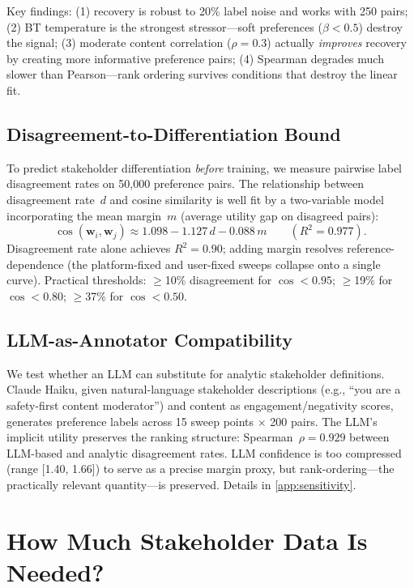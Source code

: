 \documentclass[11pt,letterpaper]{article}
\begin{document}
Key findings: (1) recovery is robust to 20\% label noise and works
with 250 pairs; (2) BT temperature is the strongest stressor---soft
preferences ($\beta < 0.5$) destroy the signal; (3) moderate content
correlation ($\rho = 0.3$) actually \emph{improves} recovery by
creating more informative preference pairs; (4) Spearman degrades
much slower than Pearson---rank ordering survives conditions that
destroy the linear fit.

\subsection{Disagreement-to-Differentiation Bound}

To predict stakeholder differentiation \emph{before} training, we
measure pairwise label disagreement rates on 50{,}000 preference
pairs. The relationship between disagreement rate~$d$ and cosine
similarity is well fit by a two-variable model incorporating the mean
margin~$m$ (average utility gap on disagreed pairs):
\begin{equation}
  \cos(\mathbf{w}_i, \mathbf{w}_j) \approx 1.098 - 1.127\,d - 0.088\,m
  \qquad (R^2 = 0.977).
  \label{eq:disagreement}
\end{equation}
Disagreement rate alone achieves $R^2 = 0.90$; adding margin resolves
reference-dependence (the platform-fixed and user-fixed sweeps
collapse onto a single curve). Practical thresholds: $\geq$10\%
disagreement for $\cos < 0.95$; $\geq$19\% for $\cos < 0.80$;
$\geq$37\% for $\cos < 0.50$.

\subsection{LLM-as-Annotator Compatibility}

We test whether an LLM can substitute for analytic stakeholder
definitions. Claude Haiku, given natural-language stakeholder
descriptions (e.g., ``you are a safety-first content moderator'') and
content as engagement/negativity scores, generates preference labels
across 15 sweep points $\times$ 200 pairs. The LLM's implicit
utility preserves the ranking structure: Spearman~$\rho = 0.929$
between LLM-based and analytic disagreement rates. LLM confidence is
too compressed (range [1.40, 1.66]) to serve as a precise margin
proxy, but rank-ordering---the practically relevant quantity---is
preserved. Details in \cref{app:sensitivity}.

\section{How Much Stakeholder Data Is Needed?}
\label{sec:partial}
\end{document}

